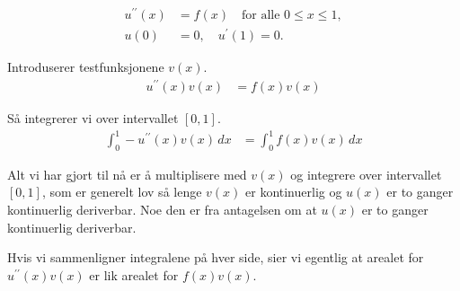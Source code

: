 \begin{align*}
    u^{\prime\prime}(x) & = f(x) \quad \text{for alle } 0 \leq x \leq 1, \\
    u(0)                & = 0,\quad u^{\prime}(1) = 0.
\end{align*}

Introduserer testfunksjonene $v(x)$.
\begin{align*}
    u^{\prime\prime}(x) v(x) & = f(x) v(x)
\end{align*}

Så integrerer vi over intervallet $[0,1]$.
\begin{align*}
    \int_0^1 -u^{\prime\prime}(x) v(x) \, dx & = \int_0^1 f(x) v(x) \, dx
\end{align*}

Alt vi har gjort til nå er å multiplisere med $v(x)$ og integrere over intervallet $[0,1]$, som er generelt lov så lenge $v(x)$ er kontinuerlig og $u(x)$ er to ganger kontinuerlig deriverbar.
Noe den er fra antagelsen om at $u(x)$ er to ganger kontinuerlig deriverbar.

Hvis vi sammenligner integralene på hver side, sier vi egentlig at arealet for $u^{\prime\prime}(x) v(x)$ er lik arealet for $f(x) v(x)$.

